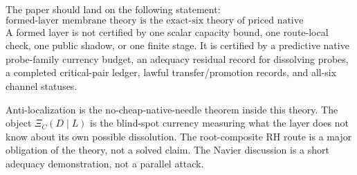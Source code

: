 \documentclass[11pt]{article}
\begin{document}
The paper should land on the following statement:
\[
\boxed{\text{formed-layer membrane theory is the exact-six theory of priced native addressability.}}
\]
A formed layer is not certified by one scalar capacity bound, one route-local check, one public shadow, or one finite stage.  It is certified by a predictive native probe-family currency budget, an adequacy residual record for dissolving probes, a completed critical-pair ledger, lawful transfer/promotion records, and all-six channel statuses.

Anti-localization is the no-cheap-native-needle theorem inside this theory.  The object \(\Xi_C(D\mid L)\) is the blind-spot currency measuring what the layer does not know about its own possible dissolution.  The root-composite RH route is a major obligation of the theory, not a solved claim.  The Navier discussion is a short adequacy demonstration, not a parallel attack.
\end{document}
